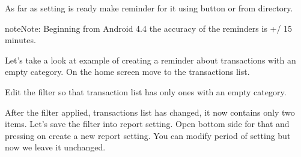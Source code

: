 \documentclass[a4paper,10pt,english]{sphinxmanual}
\begin{document}
\sphinxAtStartPar
As far as setting is ready make reminder for it using  button or from 
directory.

\begin{sphinxadmonition}{note}{Note:}
\sphinxAtStartPar
Beginning from Android 4.4 the accuracy of the reminders is +/\sphinxhyphen{} 15 minutes.
\end{sphinxadmonition}

\sphinxAtStartPar
Let’s take a look at example of creating a reminder about transactions with an empty category.
On the home screen move to the transactions list.

\noindent{}

\noindent{}

\noindent{}

\sphinxAtStartPar
Edit the filter so that transaction list has only ones with an empty category.

\noindent{}

\noindent{}

\noindent{}

\noindent{}

\noindent{}

\noindent{}

\sphinxAtStartPar
After the filter applied, transactions list has changed, it now contains only two items. Let’s
save the filter into report setting. Open bottom side for that and pressing on 
create a new report setting. You can modify period of setting but now we leave it unchanged.

\noindent{}

\noindent{}
\end{document}
